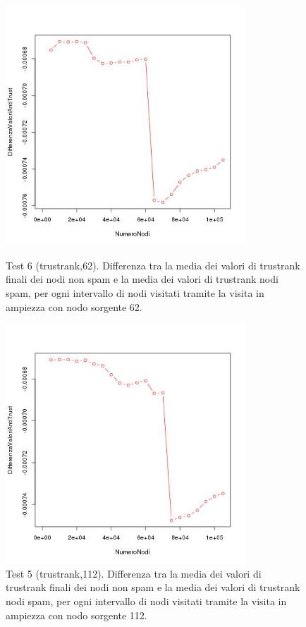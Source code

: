 \begin{figure}
 \centering
 \includegraphics[height=9cm]{immagini/test6/averageCompleteTest_antitrust_62}
  \caption{Test 6 (trustrank,62). Differenza tra la media dei valori di trustrank finali dei nodi non spam e la media dei valori di trustrank nodi spam, per ogni intervallo di nodi visitati tramite la visita in ampiezza con nodo sorgente 62.}
 \label{fig:test6antitrust62}
  \centering
 \includegraphics[height=9cm]{immagini/test6/averageCompleteTest_antitrust_112}
  \caption{Test 5 (trustrank,112). Differenza tra la media dei valori di trustrank finali dei nodi non spam e la media dei valori di trustrank nodi spam, per ogni intervallo di nodi visitati tramite la visita in ampiezza con nodo sorgente 112.}
 \label{fig:test6antitrust112}
\end{figure} 
